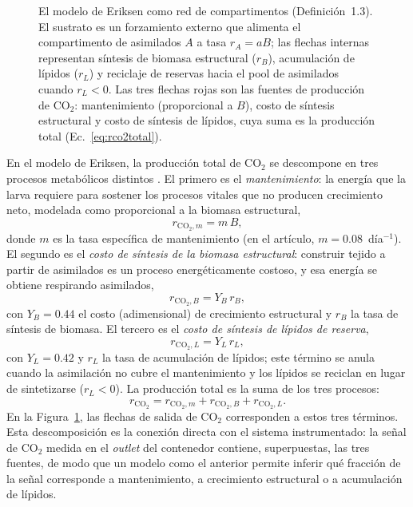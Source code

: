\begin{figure}[htbp]
\begin{tikzpicture}
\end{tikzpicture}
\caption{El modelo de Eriksen \cite{eriksenDynamicModellingFeed2022} como red de compartimentos
(Definición~1.3). El sustrato es un forzamiento externo que alimenta el
compartimento de asimilados $A$ a tasa $r_A = aB$; las flechas internas
representan síntesis de biomasa estructural ($r_B$), acumulación de lípidos
($r_L$) y reciclaje de reservas hacia el pool de asimilados cuando
$r_L < 0$. Las tres flechas rojas son las fuentes de producción de CO$_2$:
mantenimiento (proporcional a $B$), costo de síntesis estructural y costo de
síntesis de lípidos, cuya suma es la producción total
(Ec.~\eqref{eq:rco2total}).}
\label{fig:red-eriksen}
\end{figure}

En el modelo de Eriksen, la producción total de CO$_2$ se descompone en tres
procesos metabólicos distintos \cite{eriksenDynamicModellingFeed2022}. El primero es el
\emph{mantenimiento}: la energía que la larva requiere para sostener los
procesos vitales que no producen crecimiento neto, modelada como proporcional
a la biomasa estructural,
\begin{equation}
r_{\mathrm{CO_2},m} = m\,B,
\label{eq:rco2m}
\end{equation}
donde $m$ es la tasa específica de mantenimiento (en el artículo,
$m = 0.08$~día$^{-1}$). El segundo es el \emph{costo de síntesis de la
biomasa estructural}: construir tejido a partir de asimilados es un proceso
energéticamente costoso, y esa energía se obtiene respirando asimilados,
\begin{equation}
r_{\mathrm{CO_2},B} = Y_B\,r_B,
\label{eq:rco2b}
\end{equation}
con $Y_B = 0.44$ el costo (adimensional) de crecimiento estructural y $r_B$
la tasa de síntesis de biomasa. El tercero es el \emph{costo de síntesis de
lípidos de reserva},
\begin{equation}
r_{\mathrm{CO_2},L} = Y_L\,r_L,
\label{eq:rco2l}
\end{equation}
con $Y_L = 0.42$ y $r_L$ la tasa de acumulación de lípidos; este término se
anula cuando la asimilación no cubre el mantenimiento y los lípidos se
reciclan en lugar de sintetizarse ($r_L < 0$). La producción total es la suma
de los tres procesos:
\begin{equation}
r_{\mathrm{CO_2}} = r_{\mathrm{CO_2},m} + r_{\mathrm{CO_2},B} + r_{\mathrm{CO_2},L}.
\label{eq:rco2total}
\end{equation}
En la Figura~\ref{fig:red-eriksen}, las flechas de salida de CO$_2$
corresponden a estos tres términos. Esta descomposición es la conexión directa
con el sistema instrumentado: la señal de CO$_2$ medida en el \emph{outlet}
del contenedor contiene, superpuestas, las tres fuentes, de modo que un modelo
como el anterior permite inferir qué fracción de la señal corresponde a
mantenimiento, a crecimiento estructural o a acumulación de lípidos.

